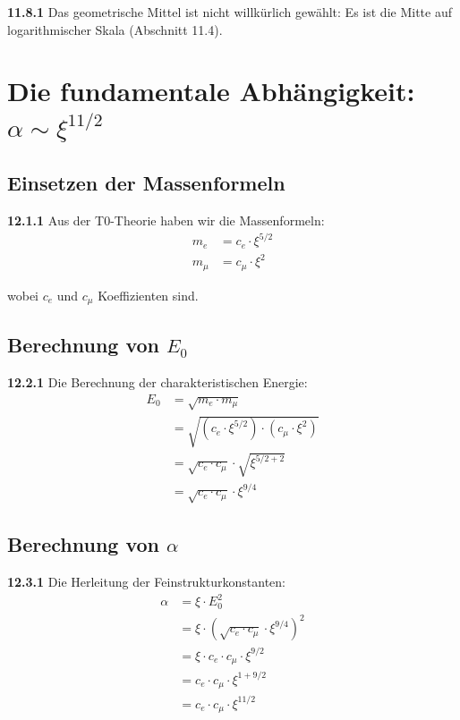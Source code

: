 \noindent \textbf{11.8.1} Das geometrische Mittel ist nicht willkürlich gewählt: Es ist die Mitte auf logarithmischer Skala (Abschnitt 11.4).

\section{Die fundamentale Abhängigkeit: $\alpha \sim \xi^{11/2}$}

\subsection{Einsetzen der Massenformeln}

\noindent \textbf{12.1.1} Aus der T0-Theorie haben wir die Massenformeln:
\begin{align}
	m_e &= c_e \cdot \xi^{5/2} \\
	m_\mu &= c_\mu \cdot \xi^2
\end{align}

wobei $c_e$ und $c_\mu$ Koeffizienten sind.

\subsection{Berechnung von $E_0$}

\noindent \textbf{12.2.1} Die Berechnung der charakteristischen Energie:
\begin{align}
	E_0 &= \sqrt{m_e \cdot m_\mu} \\
	&= \sqrt{(c_e \cdot \xi^{5/2}) \cdot (c_\mu \cdot \xi^2)} \\
	&= \sqrt{c_e \cdot c_\mu} \cdot \sqrt{\xi^{5/2 + 2}} \\
	&= \sqrt{c_e \cdot c_\mu} \cdot \xi^{9/4}
\end{align}

\subsection{Berechnung von $\alpha$}

\noindent \textbf{12.3.1} Die Herleitung der Feinstrukturkonstanten:
\begin{align}
	\alpha &= \xi \cdot E_0^2 \\
	&= \xi \cdot (\sqrt{c_e \cdot c_\mu} \cdot \xi^{9/4})^2 \\
	&= \xi \cdot c_e \cdot c_\mu \cdot \xi^{9/2} \\
	&= c_e \cdot c_\mu \cdot \xi^{1 + 9/2} \\
	&= c_e \cdot c_\mu \cdot \xi^{11/2}
\end{align}

